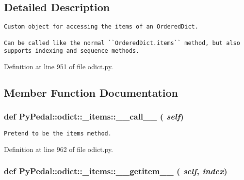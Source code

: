 \subsection{Detailed Description}


\footnotesize\begin{verbatim}
Custom object for accessing the items of an OrderedDict.

Can be called like the normal ``OrderedDict.items`` method, but also
supports indexing and sequence methods.
\end{verbatim}
\normalsize
 

Definition at line 951 of file odict.py.

\subsection{Member Function Documentation}
\hypertarget{classPyPedal_1_1odict_1_1__items_f8095a2e3f5a69db579fcd11df3fc27a}{
\subsubsection{\setlength{\rightskip}{0pt plus 5cm}def PyPedal::odict::\_\-items::\_\-\_\-call\_\-\_\- ( {\em self})}}
\label{classPyPedal_1_1odict_1_1__items_f8095a2e3f5a69db579fcd11df3fc27a}




\footnotesize\begin{verbatim}Pretend to be the items method.\end{verbatim}
\normalsize
 

Definition at line 962 of file odict.py.\hypertarget{classPyPedal_1_1odict_1_1__items_977705db2930720c52a3f18ad85e9330}{
\subsubsection{\setlength{\rightskip}{0pt plus 5cm}def PyPedal::odict::\_\-items::\_\-\_\-getitem\_\-\_\- ( {\em self}, \/   {\em index})}}
\label{classPyPedal_1_1odict_1_1__items_977705db2930720c52a3f18ad85e9330}




